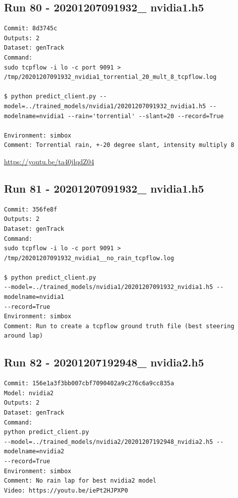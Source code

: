 \subsection{Run 80 - 20201207091932\_ nvidia1.h5 }
\label{app_res:80}
\begin{verbatim}
Commit: 8d3745c 
Outputs: 2
Dataset: genTrack
Command:
sudo tcpflow -i lo -c port 9091 > /tmp/20201207091932_nvidia1_torrential_20_mult_8_tcpflow.log

$ python predict_client.py --model=../trained_models/nvidia1/20201207091932_nvidia1.h5 --modelname=nvidia1 --rain='torrential' --slant=20 --record=True

Environment: simbox
Comment: Torrential rain, +-20 degree slant, intensity multiply 8
\end{verbatim}
\url{https://youtu.be/ta40jlqdZ04}

\subsection{Run 81 - 20201207091932\_ nvidia1.h5}
\label{app_res:81}
\begin{verbatim}
Commit: 356fe8f 
Outputs: 2
Dataset: genTrack
Command:
sudo tcpflow -i lo -c port 9091 > /tmp/20201207091932_nvidia1__no_rain_tcpflow.log

$ python predict_client.py
--model=../trained_models/nvidia1/20201207091932_nvidia1.h5 --modelname=nvidia1 
--record=True
Environment: simbox
Comment: Run to create a tcpflow ground truth file (best steering around lap)
\end{verbatim}




\subsection{Run 82 - 20201207192948\_ nvidia2.h5 }
\label{app_res:82}
\begin{verbatim}
Commit: 156e1a3f3bb007cbf7090402a9c276c6a9cc835a
Model: nvidia2 
Outputs: 2
Dataset: genTrack
Command:
python predict_client.py
--model=../trained_models/nvidia2/20201207192948_nvidia2.h5 --modelname=nvidia2 
--record=True
Environment: simbox
Comment: No rain lap for best nvidia2 model
Video: https://youtu.be/iePt2HJPXP0
\end{verbatim}


